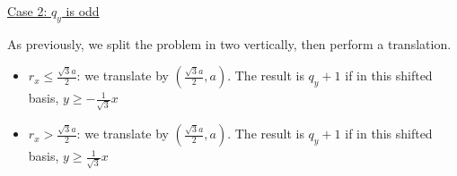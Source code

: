 \documentclass{article}
\begin{document}
\underline{Case 2: $q_y$ is odd}

As previously, we split the problem in two vertically, then perform a translation.
\begin{itemize}
\item $r_x \leq \frac{\sqrt{3}a}{2}$: we translate by $(\frac{\sqrt{3}a}{2},a)$. The result is $q_y+1$ if in this shifted basis, $y \geq -\frac{1}{\sqrt{3}}x$
\item $r_x > \frac{\sqrt{3}a}{2}$: we translate by $(\frac{\sqrt{3}a}{2},a)$. The result is $q_y+1$ if in this shifted basis, $y \geq \frac{1}{\sqrt{3}}x$
\end{itemize}
\end{document}
